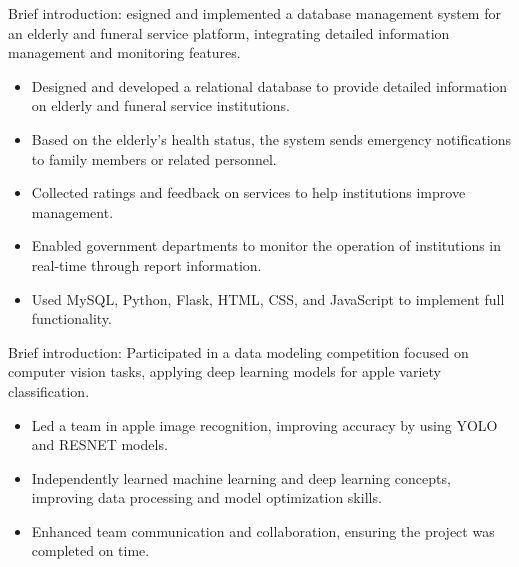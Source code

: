 \documentclass{resume}
\begin{document}
Brief introduction: esigned and implemented a database management system for an elderly and funeral service platform, integrating detailed information management and monitoring features.
\begin{itemize}
  \item Designed and developed a relational database to provide detailed information on elderly and funeral service institutions.
  \item Based on the elderly's health status, the system sends emergency notifications to family members or related personnel.
  \item Collected ratings and feedback on services to help institutions improve management.
  \item Enabled government departments to monitor the operation of institutions in real-time through report information.
  \item Used MySQL, Python, Flask, HTML, CSS, and JavaScript to implement full functionality.
\end{itemize}

Brief introduction: Participated in a data modeling competition focused on computer vision tasks, applying deep learning models for apple variety classification.
\begin{itemize}
  \item Led a team in apple image recognition, improving accuracy by using YOLO and RESNET models. 
  \item Independently learned machine learning and deep learning concepts, improving data processing and model optimization skills.
  \item Enhanced team communication and collaboration, ensuring the project was completed on time.
\end{itemize}

\end{document}
